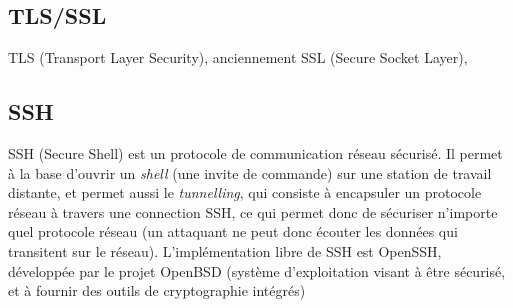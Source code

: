 \subsection{TLS/SSL}
TLS (Transport Layer Security), anciennement SSL (Secure Socket
Layer), 

\subsection{SSH}
SSH (Secure Shell) est un protocole de communication réseau
sécurisé. Il permet à la base d'ouvrir un \emph{shell} (une invite
de commande) sur une station de travail distante, et permet aussi
le \emph{tunnelling}, qui consiste à encapsuler un protocole
réseau à travers une connection SSH, ce qui permet donc de
sécuriser n'importe quel protocole réseau (un attaquant ne peut
donc écouter les données qui transitent sur le réseau).
L'implémentation libre de SSH est OpenSSH, développée par le
projet OpenBSD (système d'exploitation visant à être sécurisé, et
à fournir des outils de cryptographie intégrés)

